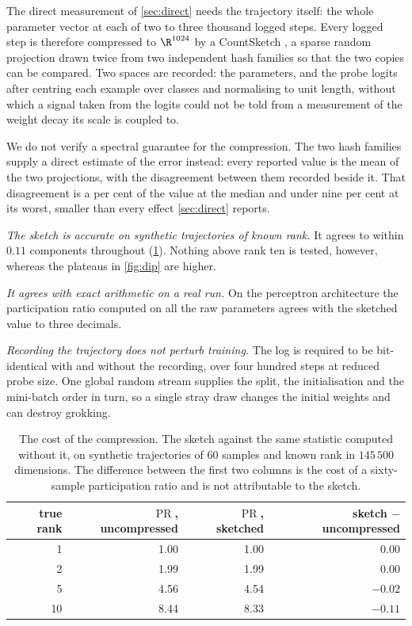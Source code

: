 \documentclass{article}
\DeclareMathOperator{\PR}{PR}
\begin{document}
The direct measurement of \cref{sec:direct} needs the trajectory itself: the whole parameter vector
at each of two to three thousand logged steps. Every logged step is therefore
compressed to $\R^{1024}$ by a CountSketch \citep{charikar2002finding, weinberger2009feature}, a
sparse random projection drawn twice from two independent hash families so that the two copies can
be compared. Two spaces are recorded: the parameters, and the probe logits after centring each
example over classes and normalising to unit length, without which a signal taken from the logits
could not be told from a measurement of the weight decay its scale is coupled to.

We do not verify a spectral guarantee for the compression. The two hash families supply a direct
estimate of the error instead: every reported value is the mean of the two projections, with the
disagreement between them recorded beside it. That disagreement is a per cent of the value at the
median and under nine per cent at its worst, smaller than every effect \cref{sec:direct}
reports.

\emph{The sketch is accurate on synthetic trajectories of known rank.} It agrees to within $0.11$
components throughout (\cref{tab:sketch}). Nothing above rank ten is tested, however, whereas the
plateaus in \cref{fig:dip} are higher.

\emph{It agrees with exact arithmetic on a real run.} On the perceptron architecture the
participation ratio computed on all the raw parameters agrees with the sketched value to three
decimals.

\emph{Recording the trajectory does not perturb training.} The log is required to be bit-identical
with and without the recording, over four hundred steps at reduced probe size. One global random
stream supplies the split, the initialisation and the mini-batch order in turn, so a single stray
draw changes the initial weights and can destroy grokking.

\begin{table}[H]
\centering
\caption{The cost of the compression. The sketch against the same statistic computed without it, on
synthetic trajectories of $60$ samples and known rank in $145\,500$ dimensions. The difference
between the first two columns is the cost of a sixty-sample participation ratio and is not
attributable to the sketch.}
\label{tab:sketch}
\begin{tabular}{rrrr}
\toprule
true rank & $\PR$, uncompressed & $\PR$, sketched & sketch $-$ uncompressed \\
\midrule
 1 & 1.00 & 1.00 & $\phantom{-}0.00$ \\
 2 & 1.99 & 1.99 & $\phantom{-}0.00$ \\
 5 & 4.56 & 4.54 & $-0.02$ \\
10 & 8.44 & 8.33 & $-0.11$ \\
\bottomrule
\end{tabular}
\end{table}
\end{document}
